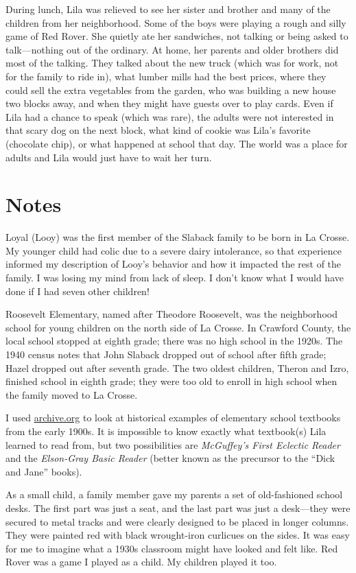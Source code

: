 \documentclass[
  american,
  letterpaper,
]{book}
\begin{document}
During lunch, Lila was relieved to see her sister and brother and many
of the children from her neighborhood. Some of the boys were playing a
rough and silly game of Red Rover. She quietly ate her sandwiches, not
talking or being asked to talk---nothing out of the ordinary. At home,
her parents and older brothers did most of the talking. They talked
about the new truck (which was for work, not for the family to ride in),
what lumber mills had the best prices, where they could sell the extra
vegetables from the garden, who was building a new house two blocks
away, and when they might have guests over to play cards. Even if Lila
had a chance to speak (which was rare), the adults were not interested
in that scary dog on the next block, what kind of cookie was Lila's
favorite (chocolate chip), or what happened at school that day. The
world was a place for adults and Lila would just have to wait her turn.

\section{Notes}\label{notes-5}

Loyal (Looy) was the first member of the Slaback family to be born in La
Crosse. My younger child had colic due to a severe dairy intolerance, so
that experience informed my description of Looy's behavior and how it
impacted the rest of the family. I was losing my mind from lack of
sleep. I don't know what I would have done if I had seven other
children!

Roosevelt Elementary, named after Theodore Roosevelt, was the
neighborhood school for young children on the north side of La Crosse.
In Crawford County, the local school stopped at eighth grade; there was
no high school in the 1920s. The 1940 census notes that John Slaback
dropped out of school after fifth grade; Hazel dropped out after seventh
grade. The two oldest children, Theron and Izro, finished school in
eighth grade; they were too old to enroll in high school when the family
moved to La Crosse.

I used \href{https://archive.org/}{archive.org} to look at historical
examples of elementary school textbooks from the early 1900s. It is
impossible to know exactly what textbook(s) Lila learned to read from,
but two possibilities are \emph{McGuffey's First Eclectic Reader} and
the \emph{Elson-Gray Basic Reader} (better known as the precursor to the
``Dick and Jane'' books).

As a small child, a family member gave my parents a set of old-fashioned
school desks. The first part was just a seat, and the last part was just
a desk---they were secured to metal tracks and were clearly designed to
be placed in longer columns. They were painted red with black
wrought-iron curlicues on the sides. It was easy for me to imagine what
a 1930s classroom might have looked and felt like. Red Rover was a game
I played as a child. My children played it too.
\end{document}

